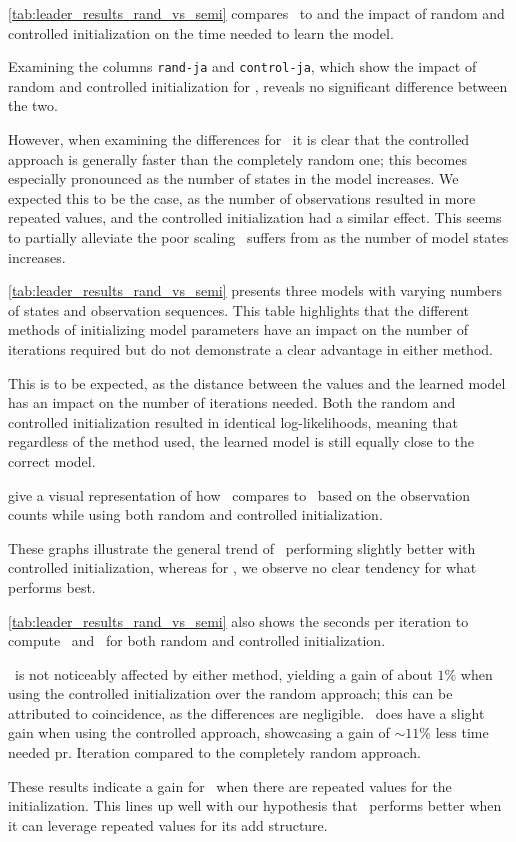 \autoref{tab:leader_results_rand_vs_semi} compares \Cupaal\ to \Jajapy and the impact of random and controlled initialization on the time needed to learn the model.

Examining the columns \texttt{rand-ja} and \texttt{control-ja}, which show the impact of random and controlled initialization for \Jajapy, reveals no significant difference between the two.

However, when examining the differences for \Cupaal\, it is clear that the controlled approach is generally faster than the completely random one; this becomes especially pronounced as the number of states in the model increases.
We expected this to be the case, as the number of observations resulted in more repeated values, and the controlled initialization had a similar effect.
This seems to partially alleviate the poor scaling \Cupaal\ suffers from as the number of model states increases.

\autoref{tab:leader_results_rand_vs_semi} presents three models with varying numbers of states and observation sequences. This table highlights that the different methods of initializing model parameters have an impact on the number of iterations required but do not demonstrate a clear advantage in either method.

This is to be expected, as the distance between the values and the learned model has an impact on the number of iterations needed.
Both the random and controlled initialization resulted in identical log-likelihoods, meaning that regardless of the method used, the learned model is still equally close to the correct model.

 give a visual representation of how \Cupaal\ compares to \Jajapy\ based on the observation counts while using both random and controlled initialization.

These graphs illustrate the general trend of \Cupaal\ performing slightly better with controlled initialization, whereas for \Jajapy, we observe no clear tendency for what performs best.

\autoref{tab:leader_results_rand_vs_semi} also shows the seconds per iteration to compute \Cupaal\ and \Jajapy\ for both random and controlled initialization.

\Jajapy\ is not noticeably affected by either method, yielding a gain of about $1\%$ when using the controlled initialization over the random approach; this can be attributed to coincidence, as the differences are negligible.
\Cupaal\ does have a slight gain when using the controlled approach, showcasing a gain of $\sim 11\%$ less time needed pr. Iteration compared to the completely random approach.

These results indicate a gain for \Cupaal\ when there are repeated values for the initialization. This lines up well with our hypothesis that \Cupaal\ performs better when it can leverage repeated values for its \gls{add} structure.
